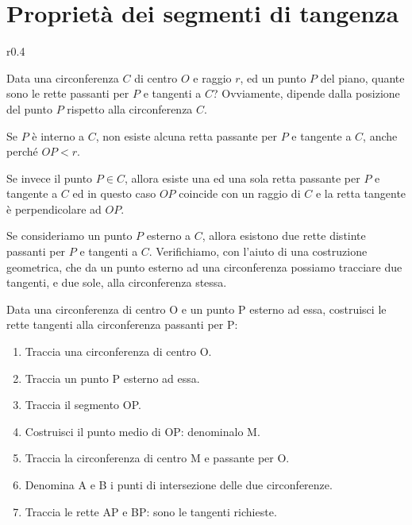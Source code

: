 \section{Proprietà dei segmenti di tangenza} 
\label{sect:proprieta_tangenti}

\begin{wrapfigure}{r}{0.4\textwidth}
\centering
\vspace{10pt}

\end{wrapfigure}
Data una circonferenza $C$ di centro $O$ e raggio $r$, ed un punto 
$P$ del piano, quante sono le rette passanti per $P$ e tangenti a $C$? 
 Ovviamente, dipende dalla posizione del punto $P$ rispetto alla 
circonferenza $C$.

Se $P$ è interno a $C$, non esiste alcuna retta passante per $P$ e 
tangente a $C$, anche perché $OP < r$.

Se invece il punto $P\in C$, allora esiste una ed una sola retta 
passante per $P$ e tangente a $C$ ed in questo caso $OP$ coincide con 
un raggio di $C$ e la retta tangente è perpendicolare ad $OP$.

Se consideriamo un punto $P$ esterno a $C$, allora esistono due rette 
distinte passanti per $P$ e tangenti a $C$. Verifichiamo, con l'aiuto 
di una costruzione geometrica, che da un punto esterno ad una 
circonferenza possiamo tracciare due tangenti, e due sole, alla 
circonferenza stessa.

\begin{procedura}
  Data una circonferenza di centro O e un punto P esterno ad essa, 
costruisci le rette tangenti alla circonferenza passanti per P:
  \begin{enumerate} [nosep]
    \item 
    Traccia una circonferenza di centro O.
    \item 
    Traccia un punto P esterno ad essa.
    \item 
    Traccia il segmento OP.
    \item 
    Costruisci il punto medio di OP: denominalo M.
    \item 
    Traccia la circonferenza di centro M e passante per O.
    \item 
    Denomina A e B i punti di intersezione delle due circonferenze.
    \item 
    Traccia le rette AP e BP: sono le tangenti richieste.  
  \end{enumerate}
\end{procedura}

